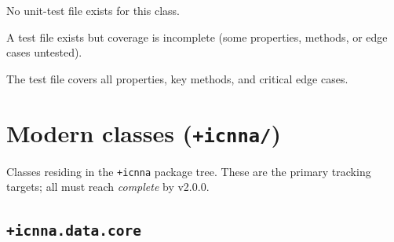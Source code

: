 \documentclass[11pt,a4paper]{article}
\newcommand{\statusNone}{\textcolor{red}{\textit{none}}}
\newcommand{\statusPartial}{\textcolor{orange}{\textit{partial}}}
\newcommand{\statusComplete}{\textcolor{green!60!black}{\textit{complete}}}
\begin{document}
\begin{description}[leftmargin=3cm, labelwidth=2.5cm]
    \item[\statusNone]    No unit-test file exists for this class.
    \item[\statusPartial] A test file exists but coverage is incomplete
                          (some properties, methods, or edge cases untested).
    \item[\statusComplete]The test file covers all properties, key methods,
                          and critical edge cases.
\end{description}

\section{Modern classes (\texttt{+icnna/})}

Classes residing in the \texttt{+icnna} package tree. These are the primary
tracking targets; all must reach \statusComplete{} by v2.0.0.

\subsection{\texttt{+icnna.data.core}}
\end{document}
